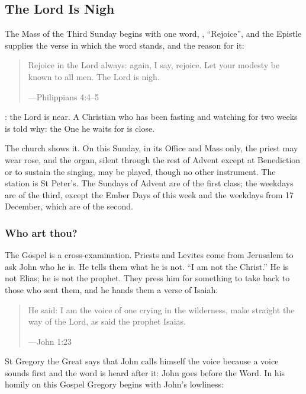 \subsection{The Lord Is Nigh}\label{sec:third-week}

The Mass of the Third Sunday begins with one word, ,
``Rejoice'', and the Epistle supplies the verse in which the word stands, and
the reason for it:

\begin{quote}
Rejoice in the Lord always: again, I say, rejoice. Let your modesty be known to
all men. The Lord is nigh.\par
{\smallskip\noindent\small ---Philippians 4:4--5\par}
\end{quote}

: the Lord is near. A Christian who has been fasting
and watching for two weeks is told why: the One he waits for is close.

The church shows it. On this Sunday, in its Office and Mass only, the priest may
wear rose, and the organ, silent through the rest of Advent except at
Benediction or to sustain the singing, may be played, though no other
instrument. The station is St Peter's. The Sundays of Advent are of the
first class; the weekdays are of the third, except the Ember Days of this week
and the weekdays from 17 December, which are of the second.

\subsubsection*{Who art thou?}

The Gospel is a cross-examination. Priests and Levites come from Jerusalem to ask
John who he is. He tells them what he is not. ``I am not the
Christ.'' He is not Elias; he is not the prophet. They press him for something
to take back to those who sent them, and he hands them a verse of Isaiah:

\begin{quote}
He said: I am the voice of one crying in the wilderness, make straight the way
of the Lord, as said the prophet Isaias.\par
{\smallskip\noindent\small ---John 1:23\par}
\end{quote}

St Gregory the Great says that John calls himself the voice because a voice
sounds first and the word is heard after it: John goes before the Word. In his
homily on this Gospel Gregory begins with John's lowliness:

